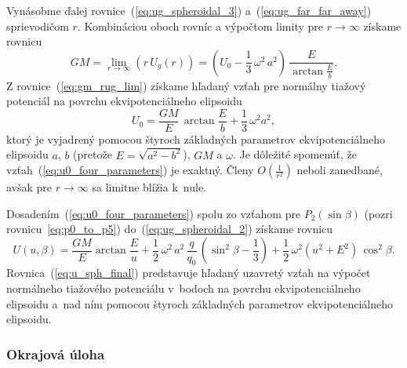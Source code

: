 \documentclass[a4paper,12pt]{book}
\begin{document}
Vynásobme ďalej rovnice~(\ref{eq:ug_spheroidal_3}) a~(\ref{eq:ug_far_far_away}) 
sprievodičom $r$.  Kombináciou oboch rovníc a výpočtom limity pre $r 
\rightarrow \infty$ získame rovnicu
%
\begin{equation}
\label{eq:gm_rug_lim}
GM = \lim_{r \rightarrow \infty} (r \, U_g(r)) = \left( U_0 - \frac{1}{3} \, 
\omega^2 \, a^2 \right) \, \frac{E}{\arctan\frac{E}{b}}{.}
\end{equation}
%
Z rovnice~(\ref{eq:gm_rug_lim}) získame hľadaný vzťah pre normálny tiažový 
potenciál na povrchu ekvipotenciálneho elipsoidu
%
\begin{equation}
\label{eq:u0_four_parameters}
U_0 = \frac{GM}{E} \, \arctan\frac{E}{b} + \frac{1}{3} \, \omega^2 a^2{,}
\end{equation}
%
ktorý je vyjadrený pomocou štyroch základných parametrov ekvipotenciálneho 
elipsoidu $a$, $b$ (pretože $E = \sqrt{a^2 - b^2}$), $GM$ a $\omega$.  Je 
dôležité spomenúť, že vzťah~(\ref{eq:u0_four_parameters}) je exaktný.  Členy 
$O\left( \frac{1}{r^2} \right)$ neboli zanedbané, avšak pre $r \rightarrow 
\infty$ sa limitne blížia k~nule.

Dosadením~(\ref{eq:u0_four_parameters}) spolu zo vzťahom pre $P_2(\sin\beta)$ 
(pozri rovnicu~\ref{eq:p0_to_p5}) do~(\ref{eq:ug_spheroidal_2}) získame rovnicu
%
\begin{equation}
\label{eq:u_sph_final}
U(u, \beta) = \frac{GM}{E} \arctan\frac{E}{u} + \frac{1}{2} \, \omega^2 \, a^2 
\, \frac{q}{q_0} \, \left( \sin^2\beta - \frac{1}{3} \right) + \frac{1}{2} \, 
\omega^2 (u^2 + E^2) \, \cos^2\beta{.}
\end{equation}
%
Rovnica~(\ref{eq:u_sph_final}) predstavuje hľadaný uzavretý vzťah na výpočet 
normálneho tiažového potenciálu v~bodoch na povrchu ekvipotenciálneho elipsoidu 
a~nad ním pomocou štyroch základných parametrov ekvipotenciálneho elipsoidu.



\subsubsection{Okrajová úloha}
\end{document}
